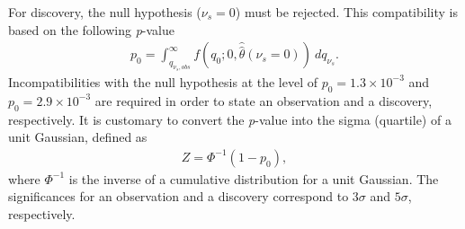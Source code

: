 For discovery, the null hypothesis ($\nu_s = 0$) must be rejected. This compatibility is based on the following \emph{p}-value
\begin{equation}
    \label{eq:pvalue_bonly}
    \begin{aligned}
        p_{0} = \int_{q_{\nu_s,obs}}^\infty f(q_0;0,\hat{\hat{\theta}}(\nu_s =0))~dq_{\nu_s}.
    \end{aligned}
\end{equation}
Incompatibilities with the null hypothesis at the level of $p_0 = 1.3 \times 10^{-3}$ and $p_0 = 2.9 \times 10^{-3}$ are required in order to state an observation and a discovery, respectively. It is customary to convert the \emph{p}-value into the sigma (quartile) of a unit Gaussian, defined as
\begin{equation}
    \label{eq:sigma}
    \begin{aligned}
    Z = \Phi^{-1}(1-p_0),
    \end{aligned}
\end{equation}
where $\Phi^{-1}$ is the inverse of a cumulative distribution for a unit Gaussian. The significances for an observation and a discovery correspond to $3\sigma$ and $5\sigma$, respectively.

